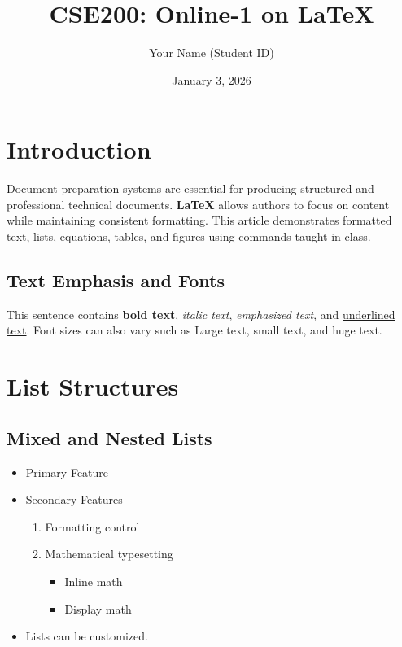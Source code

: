 \documentclass[11pt]{article}
\title{CSE200: Online-1 on \LaTeX}
\author{Your Name (Student ID)}
\date{January 3, 2026}
\begin{document}
\maketitle

\section{Introduction}
Document preparation systems are essential for producing structured and
professional technical documents. \textbf{\LaTeX} allows authors to focus on
content while maintaining consistent formatting. This article demonstrates
formatted text, lists, equations, tables, and figures using commands taught in
class.

\subsection{Text Emphasis and Fonts}
This sentence contains \textbf{bold text}, \textit{italic text},
\emph{emphasized text}, and \underline{underlined text}. Font sizes can also vary
such as {\Large Large text}, {\small small text}, and {\huge huge text}.

\section{List Structures}

\subsection{Mixed and Nested Lists}
\begin{itemize}
    \item Primary Feature
    \item Secondary Features
    \begin{enumerate}
        \item Formatting control
        \item Mathematical typesetting
        \begin{itemize}
            \item Inline math
            \item Display math
        \end{itemize}
    \end{enumerate}
    \item[\textbf{Note}] Lists can be customized.
\end{itemize}
\end{document}
